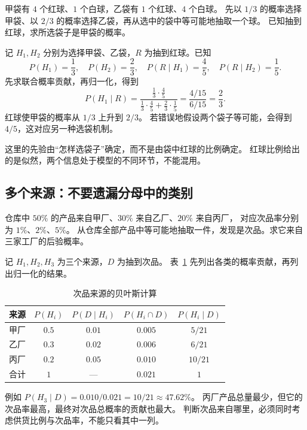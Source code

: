\documentclass[UTF8]{ctexart}
\begin{document}
\begin{example}[抽到红球后判断袋子]
\label{ex:bayes-bags}
甲袋有 $4$ 个红球、$1$ 个白球，乙袋有 $1$ 个红球、$4$ 个白球。
先以 $1/3$ 的概率选择甲袋、以 $2/3$ 的概率选择乙袋，再从选中的袋中等可能地抽取一个球。
已知抽到红球，求所选袋子是甲袋的概率。
\end{example}
\begin{solve}
记 $H_1,H_2$ 分别为选择甲袋、乙袋，$R$ 为抽到红球。已知
\[
  P(H_1)=\frac13,\quad P(H_2)=\frac23,\quad
  P(R\mid H_1)=\frac45,\quad P(R\mid H_2)=\frac15.
\]
先求联合概率贡献，再归一化，得到
\[
  P(H_1\mid R)
  =\frac{\frac13\cdot\frac45}
  {\frac13\cdot\frac45+\frac23\cdot\frac15}
  =\frac{4/15}{6/15}=\frac23.
\]
红球使甲袋的概率从 $1/3$ 上升到 $2/3$。
若错误地假设两个袋子等可能，会得到 $4/5$，这对应另一种选袋机制。
\end{solve}

这里的先验由“怎样选袋子”确定，而不是由袋中红球的比例确定。
红球比例给出的是似然，两个信息处于模型的不同环节，不能混用。

\subsection{多个来源：不要遗漏分母中的类别}

\begin{example}[三家工厂的次品溯源]
\label{ex:bayes-factories}
仓库中 $50\%$ 的产品来自甲厂、$30\%$ 来自乙厂、$20\%$ 来自丙厂，
对应次品率分别为 $1\%$、$2\%$、$5\%$。
从仓库全部产品中等可能地抽取一件，发现是次品。求它来自三家工厂的后验概率。
\end{example}
\begin{solve}
记 $H_1,H_2,H_3$ 为三个来源，$D$ 为抽到次品。
表~\ref{tab:bayes-factories} 先列出各类的概率贡献，再列出归一化的结果。
\begin{table}[htbp]
  \centering
  \caption{次品来源的贝叶斯计算}
  \label{tab:bayes-factories}
  \begin{tabular}{lcccc}
    \toprule
    来源 & $P(H_i)$ & $P(D\mid H_i)$ & $P(H_i\cap D)$ & $P(H_i\mid D)$ \\
    \midrule
    甲厂 & $0.5$ & $0.01$ & $0.005$ & $5/21$ \\
    乙厂 & $0.3$ & $0.02$ & $0.006$ & $6/21$ \\
    丙厂 & $0.2$ & $0.05$ & $0.010$ & $10/21$ \\
    合计 & $1$ & --- & $0.021$ & $1$ \\
    \bottomrule
  \end{tabular}
\end{table}
例如 $P(H_3\mid D)=0.010/0.021=10/21\approx47.62\%$。
丙厂产品总量最少，但它的次品率最高，最终对次品总概率的贡献也最大。
判断次品来自哪里，必须同时考虑供货比例与次品率，不能只看其中一列。
\end{solve}
\end{document}
